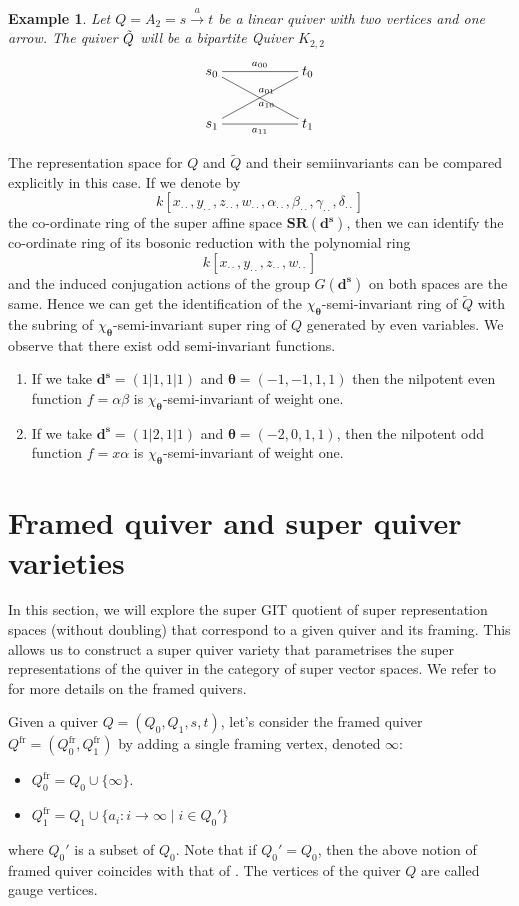 \documentclass[12pt, reqno]{amsart}
\theoremstyle{plain}
\newtheorem{example}[theorem]{Example}
\numberwithin{equation}{section}
\def \sd{\mathbf{d^s}}
\def \btheta{\boldsymbol{\theta}}
\begin{document}
\begin{example}
Let $Q=A_2 = s \xrightarrow{a} t$ be a linear quiver with two vertices and one arrow. The quiver $\Tilde{Q}$ will be a 
bipartite Quiver $K_{2,2}$
\[
\xymatrix{
s_0 \ar@{-}[rr]^{a_{00}} \ar@{-}[drr]^{a_{01}} && t_0 \\
s_1 \ar@{-}[urr]_
{a_{10}} \ar@{-}[rr]_{a_{11}} && t_1
}
\]
\end{example}
The representation space for $Q$ and $\tilde{Q}$ and their semiinvariants can be compared explicitly in this case.
If we denote by \[
k[x_{\cdot\cdot},y_{\cdot \cdot}, z_{\cdot \cdot}, w_{\cdot \cdot},\alpha_{\cdot \cdot}, \beta_{\cdot \cdot}, \gamma_{\cdot \cdot}, \delta_{\cdot \cdot}]
\]
the co-ordinate ring of the  super affine space $\mathbf{SR}(\sd)$, then we can identify the co-ordinate ring of its bosonic reduction with the polynomial ring 
\[
k[x_{\cdot \cdot},y_{\cdot \cdot}, z_{\cdot \cdot}, w_{\cdot \cdot}]
\]
and the induced conjugation actions of the group $G(\sd)$ on both spaces are the same. Hence we can get the identification of the $\chi_{\btheta}$-semi-invariant ring of $\tilde{Q}$ with the subring of $\chi_{\btheta}$-semi-invariant super ring of $Q$ generated by even variables. 
We observe that there exist odd semi-invariant functions.
\begin{enumerate}
    \item If we take $\sd = (1|1,1|1)$ and $\btheta = (-1, -1, 1, 1)$ then the nilpotent even function $f = \alpha \beta$ is $\chi_{\btheta}$-semi-invariant of weight one. 
    \item If we take $\sd = (1|2, 1|1)$ and $\btheta = (-2, 0, 1, 1)$, then the nilpotent odd function $f = x \alpha$ is $\chi_{\btheta}$-semi-invariant of weight one.
\end{enumerate}

\section{Framed quiver and super quiver varieties}
In this section, we will explore the super GIT quotient of super representation spaces (without doubling) that correspond to a given quiver and its framing. This allows us to construct a super quiver variety that parametrises the super representations of the quiver in the category of super vector spaces. 
We refer to \cite{CB, Nak} for more details on the framed quivers. 

Given a quiver $Q = (Q_0, Q_1, s, t)$, let's consider the framed quiver $Q^{\mathrm{fr}} = (Q^{\mathrm{fr}}_0, Q^{\mathrm{fr}}_1)$ by adding a single framing vertex, denoted $\infty$:
\begin{itemize}
    \item $Q^{\mathrm{fr}}_0 = Q_0 \cup \{\infty\}$.
    \\
    \item $Q^{\mathrm{fr}}_1 = Q_1 \cup \{a_i: i \to \infty \mid i \in Q_0'\}$\,
\end{itemize}
where $Q_0'$ is a subset of $Q_0$. Note that if $Q_0' = Q_0$, then the above notion of framed quiver coincides with that of \cite{CB}.
The vertices of the quiver $Q$ are called gauge vertices.
\end{document}
